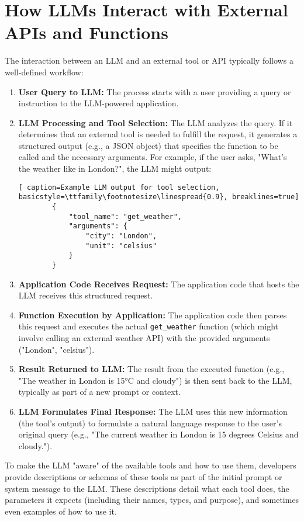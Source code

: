 \section{How LLMs Interact with External APIs and Functions}

The interaction between an LLM and an external tool or API typically follows a well-defined workflow:

\begin{enumerate}[label=\arabic*.]
    \item \textbf{User Query to LLM:} The process starts with a user providing a query or instruction to the LLM-powered application.
    \item \textbf{LLM Processing and Tool Selection:} The LLM analyzes the query. If it determines that an external tool is needed to fulfill the request, 
    it generates a structured output (e.g., a JSON object) that specifies the function to be called and the necessary arguments. For example, if the user asks, 
    "What's the weather like in London?", the LLM might output:
	\begin{lstlisting}[ caption=Example LLM output for tool selection, basicstyle=\ttfamily\footnotesize\linespread{0.9}, breaklines=true]
		{
			"tool_name": "get_weather",
			"arguments": {
				"city": "London",
				"unit": "celsius"
			}
		}
	\end{lstlisting}
    \item \textbf{Application Code Receives Request:} The application code that hosts the LLM receives this structured request.
    \item \textbf{Function Execution by Application:} The application code then parses this request and executes the actual \texttt{get\_weather} function 
    (which might involve calling an external weather API) with the provided arguments ("London", "celsius").
    \item \textbf{Result Returned to LLM:} The result from the executed function (e.g., "The weather in London is 15°C and cloudy") is then sent back to the 
    LLM, typically as part of a new prompt or context.
    \item \textbf{LLM Formulates Final Response:} The LLM uses this new information (the tool's output) to formulate a natural language response to the user's 
    original query (e.g., "The current weather in London is 15 degrees Celsius and cloudy.").
\end{enumerate}

To make the LLM "aware" of the available tools and how to use them, developers provide descriptions or schemas of these tools as part of the initial prompt or 
system message to the LLM. These descriptions detail what each tool does, the parameters it expects (including their names, types, and purpose), and sometimes 
even examples of how to use it.

